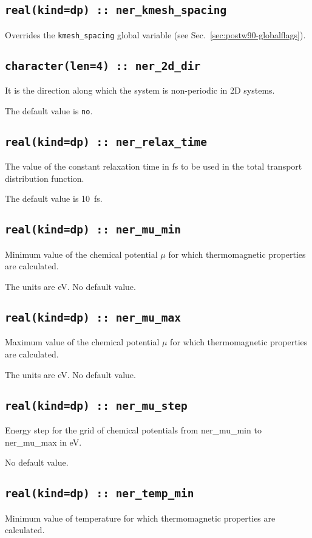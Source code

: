 \subsection[ner\_kmesh\_spacing]{\tt real(kind=dp) :: ner\_kmesh\_spacing}
Overrides the \verb#kmesh_spacing# global variable (see
Sec.~\ref{sec:postw90-globalflags}).

\subsection[ner\_2d\_dir]{\tt  character(len=4) :: ner\_2d\_dir}
\label{sec:boltz2ddir}
It is the direction along which the system is non-periodic in 2D systems.

The default value is \texttt{no}.

\subsection[ner\_relax\_time]{\tt real(kind=dp) :: ner\_relax\_time}
The value of the constant relaxation time in fs to be used in the total transport distribution function.

The default value is 10~fs.

\subsection[ner\_mu\_min]{\tt real(kind=dp) :: ner\_mu\_min}
Minimum value of the chemical potential $\mu$ for which thermomagnetic properties are calculated.

The units are eV.
No default value.

\subsection[ner\_mu\_max]{\tt real(kind=dp) :: ner\_mu\_max}
Maximum value of the chemical potential $\mu$ for which thermomagnetic properties are calculated.

The units are eV.
No default value.

\subsection[ner\_mu\_step]{\tt real(kind=dp) :: ner\_mu\_step}
Energy step for the grid of chemical potentials from ner\_mu\_min to ner\_mu\_max in eV. 

No default value.

\subsection[ner\_temp\_min]{\tt real(kind=dp) :: ner\_temp\_min}
Minimum value of temperature for which thermomagnetic properties are calculated.

